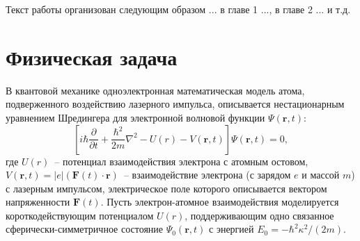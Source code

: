 \documentclass[14pt]{extarticle}
\newcommand{\vF}{\mathbf{F}}
\newcommand{\vr}{\mathbf{r}}
\begin{document}
Текст работы организован следующим образом ... в главе 1 ..., в главе 2 ... и т.д.
\newpage


\section{Физическая задача}

В квантовой механике одноэлектронная математическая модель атома, подверженного воздействию
лазерного импульса, описывается нестационарным уравнением Шредингера для электронной волновой функции $\Psi(\vr,t)$:
\begin{equation}
\label{TDSE}
\left[i\hbar\frac{\partial}{\partial t} + \frac{\hbar^2}{2m}\nabla^2 - U(r) - V(\vr,t)\right]\Psi(\vr,t) = 0,
\end{equation}
где $U(r)$~-- потенциал взаимодействия электрона с атомным остовом, $V(\vr,t)=|e|(\vF(t)\cdot\vr)$~-- взаимодействие электрона (с зарядом $e$ и массой $m$) с лазерным импульсом, электрическое поле которого описывается вектором напряженности $\vF(t)$. Пусть электрон-атомное взаимодействия моделируется короткодействующим потенциалом $U(r)$, поддерживающим одно связанное сферически-симметричное состояние $\Psi_0(\vr,t)$ с энергией $E_0=-\hbar^2\kappa^2/(2m)$. 
\end{document}
